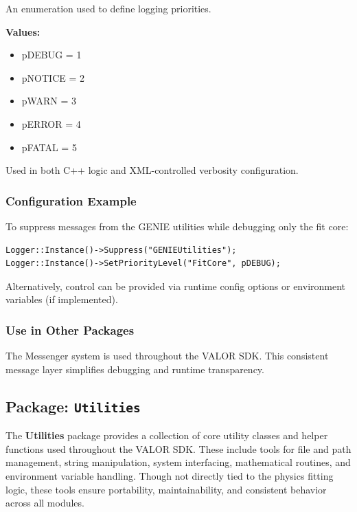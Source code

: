 An enumeration used to define logging priorities.

\noindent\textbf{Values:}

\begin{itemize}
  \item {\color{amber}pDEBUG = 1}
  \item {\color{amber}pNOTICE = 2}
  \item {\color{amber}pWARN = 3}
  \item {\color{amber}pERROR = 4}
  \item {\color{amber}pFATAL = 5}
\end{itemize}

Used in both C++ logic and XML-controlled verbosity configuration.

\vspace{1em}
\subsubsection*{\color{cadmiumgreen}\bf Configuration Example}

To suppress messages from the GENIE utilities while debugging only the fit core:

\begin{lstlisting}
Logger::Instance()->Suppress("GENIEUtilities");
Logger::Instance()->SetPriorityLevel("FitCore", pDEBUG);
\end{lstlisting}

\noindent Alternatively, control can be provided via runtime config options or environment variables (if implemented).

\vspace{1em}
\subsubsection*{Use in Other Packages}

The {\color{cadmiumgreen} Messenger} system is used throughout the VALOR SDK.
This consistent message layer simplifies debugging and runtime transparency.

%
%
%

\subsection{Package: \texttt{Utilities}}

The {\color{cadmiumgreen} \textbf{Utilities}} package provides a collection of core utility classes and helper functions used throughout the VALOR SDK.  
These include tools for file and path management, string manipulation, system interfacing, mathematical routines, and environment variable handling.  
Though not directly tied to the physics fitting logic, these tools ensure portability, maintainability, and consistent behavior across all modules.

